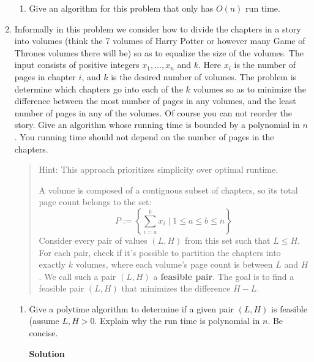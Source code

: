 \documentclass[letterpaper,12pt]{article}
\begin{document}
\begin{enumerate}
\begin{enumerate}
\item
Give an algorithm for this problem that only has $O(n)$ 
run time. 


\end{enumerate}



\item Informally in this problem we consider how to divide the chapters in a story into volumes (think the 7 volumes of Harry Potter
or however many Game of Thrones volumes there will be) so as to equalize the size of the volumes. 
The input consists of positive integers $x_1, \ldots, x_n$ and $k$. Here $x_i$ is the number of pages in chapter $i$, and $k$ is the desired number of volumes. The problem is determine which chapters go
into each of the $k$ volumes so as to minimize the difference between the most number of pages in
any volumes, and the least number of pages in any of the volumes. Of course you can not reorder the story. 
Give an algorithm whose running time is bounded by a  polynomial in $n$. You running time should not
depend on the number of pages in the chapters. 


\smallskip
\begin{quote}
Hint: This approach prioritizes simplicity over optimal runtime.

A volume is composed of a contiguous subset of chapters, so its total page count belongs to the set:
\[
P := \left\{ \sum_{i=a}^{b} x_i \mid 1 \le a \le b \le n \right\}
\]
Consider every pair of values $(L, H)$ from this set such that $L \le H$. For each pair, check if it's possible to partition the chapters into exactly $k$ volumes, where each volume's page count is between $L$ and $H$. We call such a pair $(L, H)$ a \textbf{feasible pair}. The goal is to find a feasible pair $(L, H)$ that minimizes the difference $H-L$. 

\end{quote}

\begin{enumerate}
\item Give a polytime algorithm to determine if a given pair $(L, H)$ is feasible (assume $L, H >0 $. Explain why the run time is polynomial in $n$. Be concise. 


\textbf{Solution}





\end{enumerate}
\end{enumerate}
\end{document}
